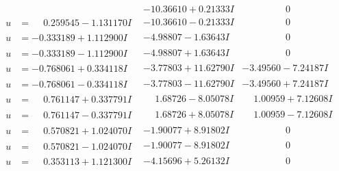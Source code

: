 \documentclass[1p]{elsarticle_modified}
\theoremstyle{definition}
\begin{document}
$$\begin{array}{c|c|c}
 & -10.36610 + 0.21333 I & \phantom{-0.000000 } 0 \\ \hline\begin{aligned}
u &= \phantom{-}0.259545 - 1.131170 I\end{aligned}
 & -10.36610 - 0.21333 I & \phantom{-0.000000 } 0 \\ \hline\begin{aligned}
u &= -0.333189 + 1.112900 I\end{aligned}
 & -4.98807 - 1.63643 I & \phantom{-0.000000 } 0 \\ \hline\begin{aligned}
u &= -0.333189 - 1.112900 I\end{aligned}
 & -4.98807 + 1.63643 I & \phantom{-0.000000 } 0 \\ \hline\begin{aligned}
u &= -0.768061 + 0.334118 I\end{aligned}
 & -3.77803 + 11.62790 I & -3.49560 - 7.24187 I \\ \hline\begin{aligned}
u &= -0.768061 - 0.334118 I\end{aligned}
 & -3.77803 - 11.62790 I & -3.49560 + 7.24187 I \\ \hline\begin{aligned}
u &= \phantom{-}0.761147 + 0.337791 I\end{aligned}
 & \phantom{-}1.68726 - 8.05078 I & \phantom{-}1.00959 + 7.12608 I \\ \hline\begin{aligned}
u &= \phantom{-}0.761147 - 0.337791 I\end{aligned}
 & \phantom{-}1.68726 + 8.05078 I & \phantom{-}1.00959 - 7.12608 I \\ \hline\begin{aligned}
u &= \phantom{-}0.570821 + 1.024070 I\end{aligned}
 & -1.90077 + 8.91802 I & \phantom{-0.000000 } 0 \\ \hline\begin{aligned}
u &= \phantom{-}0.570821 - 1.024070 I\end{aligned}
 & -1.90077 - 8.91802 I & \phantom{-0.000000 } 0 \\ \hline\begin{aligned}
u &= \phantom{-}0.353113 + 1.121300 I\end{aligned}
 & -4.15696 + 5.26132 I & \phantom{-0.000000 } 0 \\ \hline\begin{aligned}

\end{aligned}
\end{array}$$
\end{document}
